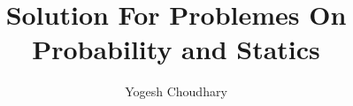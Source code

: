 \documentclass[journal,12pt,twocolumn]{IEEEtran}
\begin{document}
\makeatletter
{}
\makeatother
\let\StandardTheFigure\thefigure
\let\vec\mathbf
\renewcommand{\thefigure}{\theproblem}
\def\putbox#1#2#3{\makebox[0in][l]{\makebox[#1][l]{}\raisebox{\baselineskip}[0in][0in]{\raisebox{#2}[0in][0in]{#3}}}}
     \def\rightbox#1{\makebox[0in][r]{#1}}
     \def\centbox#1{\makebox[0in]{#1}}
     \def\topbox#1{\raisebox{-\baselineskip}[0in][0in]{#1}}
     \def\midbox#1{\raisebox{-0.5\baselineskip}[0in][0in]{#1}}
\vspace{3cm}
\title{Solution For   Problemes On Probability and Statics}
\author{Yogesh Choudhary}
%
%
%
% 
%
\end{document}
